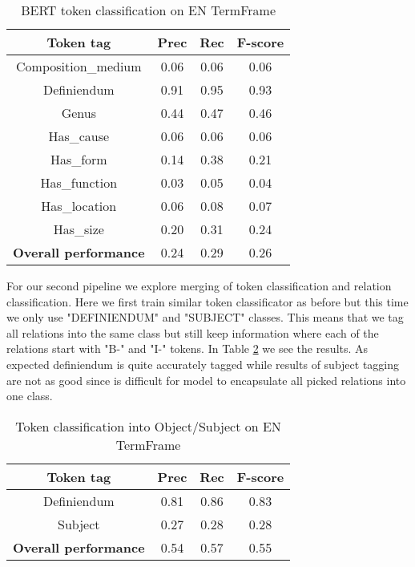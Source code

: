 \documentclass[fleqn,moreauthors,10pt]{ds_report}
\begin{document}
\begin{table}[!ht]
    \centering
    \begin{tabular}{|c|c|c|c|}
        \hline
        \textbf{Token tag} & \textbf{Prec} & \textbf{Rec} & \textbf{F-score} \\ \hline \hline
        Composition\_medium  &  0.06  &  0.06  &  0.06 \\ \hline
        Definiendum               &  0.91  &  0.95  &  0.93 \\ \hline
        Genus               &  0.44  &  0.47  &  0.46 \\ \hline
        Has\_cause           &  0.06  &  0.06  &  0.06 \\ \hline
        Has\_form           &  0.14  &  0.38  &  0.21 \\ \hline
        Has\_function        & 0.03  &   0.05  &  0.04 \\ \hline
        Has\_location        &  0.06  &  0.08  &  0.07 \\ \hline
        Has\_size            & 0.20 &  0.31  &  0.24 \\ \hline \hline
        \textbf{Overall performance} & 0.24 & 0.29 & 0.26 \\ \hline
    \end{tabular}
    \caption{BERT token classification on EN TermFrame}
    \label{tab:tagger_all}
\end{table}



\par For our second pipeline we explore merging of token classification and relation classification. Here we first train similar token classificator as before but this time we only use "DEFINIENDUM" and "SUBJECT" classes. This means that we tag all relations into the same class but still keep information where each of the relations start with "B-" and "I-" tokens. In Table \ref{tab:tagger_objsubj} we see the results. As expected definiendum is quite accurately tagged while results of subject tagging are not as good since is difficult for model to encapsulate all picked relations into one class.

\begin{table}[!ht]
    \centering
    \begin{tabular}{|c|c|c|c|}
        \hline
        \textbf{Token tag} & \textbf{Prec} & \textbf{Rec} & \textbf{F-score} \\ \hline \hline
        Definiendum               &  0.81  &  0.86  &  0.83 \\ \hline
        Subject               &  0.27  &  0.28  &  0.28 \\ \hline
        \textbf{Overall performance} & 0.54 & 0.57 & 0.55 \\ \hline
    \end{tabular}
    \caption{Token classification into Object/Subject on EN TermFrame}
    \label{tab:tagger_objsubj}
\end{table}
\end{document}
